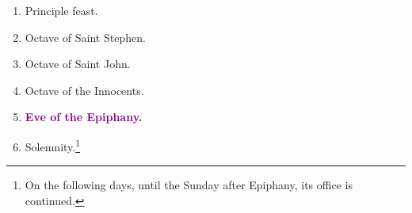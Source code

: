 		\begin{enumerate}
			\item {} Principle feast.
			\item Octave of Saint Stephen. 
			\item Octave of Saint John. 
			\item Octave of the Innocents. 
			\item \textcolor{purple}{\textbf{Eve of the Epiphany.}}
			\item {} Solemnity.\footnote{On the following days, until the Sunday after Epiphany, its office is continued.}
		\end{enumerate}
